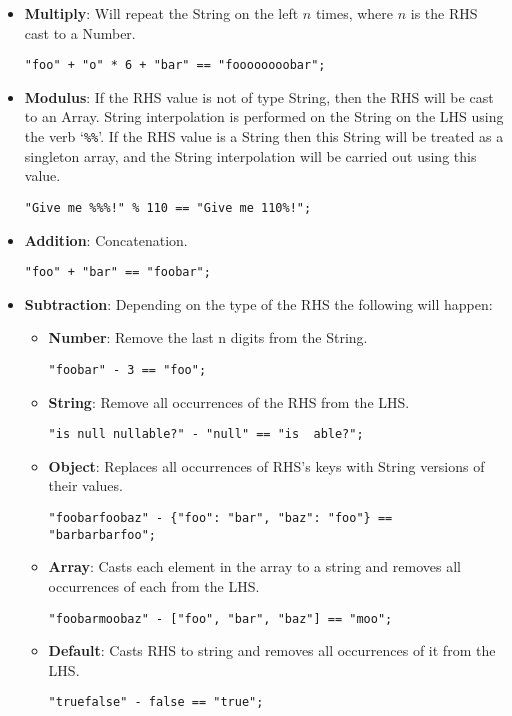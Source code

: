 \begin{itemize}
    \item \textbf{Multiply}: Will repeat the String on the left $n$ times, where $n$ is the RHS cast to a Number.
    \begin{verbatim}
"foo" + "o" * 6 + "bar" == "foooooooobar";
    \end{verbatim}
    \item \textbf{Modulus}: If the RHS value is not of type String, then the RHS will be cast to an Array. String interpolation is performed on the String on the LHS using the verb `\verb|%%|'. If the RHS value is a String then this String will be treated as a singleton array, and the String interpolation will be carried out using this value.
    \begin{verbatim}
"Give me %%%!" % 110 == "Give me 110%!";
    \end{verbatim}
    \item \textbf{Addition}: Concatenation.
    \begin{verbatim}
"foo" + "bar" == "foobar";
    \end{verbatim}
    \item \textbf{Subtraction}: Depending on the type of the RHS the following will happen:
    \begin{itemize}
        \item \textbf{Number}:  Remove the last n digits from the String.
        \begin{verbatim}
"foobar" - 3 == "foo";
        \end{verbatim}
        \item \textbf{String}:  Remove all occurrences of the RHS from the LHS.
        \begin{verbatim}
"is null nullable?" - "null" == "is  able?";
        \end{verbatim}
        \item \textbf{Object}:  Replaces all occurrences of RHS's keys with String versions of their values.
        \begin{verbatim}
"foobarfoobaz" - {"foo": "bar", "baz": "foo"} == "barbarbarfoo";
        \end{verbatim}
        \item \textbf{Array}:   Casts each element in the array to a string and removes all occurrences of each from the LHS.
        \begin{verbatim}
"foobarmoobaz" - ["foo", "bar", "baz"] == "moo";
        \end{verbatim}
        \item \textbf{Default}: Casts RHS to string and removes all occurrences of it from the LHS.
        \begin{verbatim}
"truefalse" - false == "true";
        \end{verbatim}
    \end{itemize}
\end{itemize}

